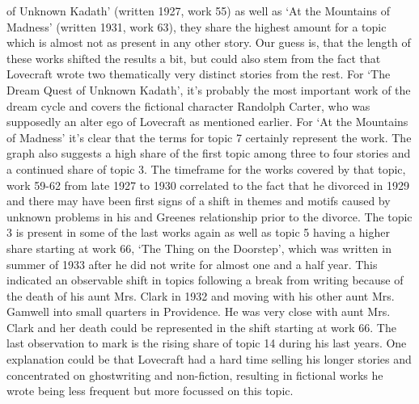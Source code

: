 of Unknown Kadath’ (written 1927, work 55) as well as ‘At the Mountains of Madness’ (written 
1931, work 63), they share the highest amount for a topic which is almost not as present in 
any other story. Our guess is, that the length of these works shifted the results a bit, but 
could also stem from the fact that Lovecraft wrote two thematically very distinct stories 
from the rest. For ‘The Dream Quest of Unknown Kadath’, it’s probably the most important 
work of the dream cycle and covers the fictional character Randolph Carter, who was supposedly 
an alter ego of Lovecraft as mentioned earlier. For ‘At the Mountains of Madness’ it’s clear 
that the terms for topic 7 certainly represent the work. The graph also suggests a high 
share of the first topic among three to four stories and a continued share of topic 3. 
The timeframe for the works covered by that topic, work 59-62 from late 1927 to 1930 
correlated to the fact that he divorced in 1929 and there may have been first signs of a shift 
in themes and motifs caused by unknown problems in his and Greenes relationship prior to the 
divorce. The topic 3 is present in some of the last works again as well as topic 5 having a 
higher share starting at work 66, ‘The Thing on the Doorstep’, which was written in summer 
of 1933 after he did not write for almost one and a half year. This indicated an observable 
shift in topics following a break from writing because of the death of his aunt Mrs. Clark in 
1932 and moving with his other aunt Mrs. Gamwell into small quarters in Providence. He was 
very close with aunt Mrs. Clark and her death could be represented in the shift starting at 
work 66. The last observation to mark is the rising share of topic 14 during his last years. 
One explanation could be that Lovecraft had a hard time selling his longer stories and concentrated 
on ghostwriting and non-fiction, resulting in fictional works he wrote being less frequent but 
more focussed on this topic.
